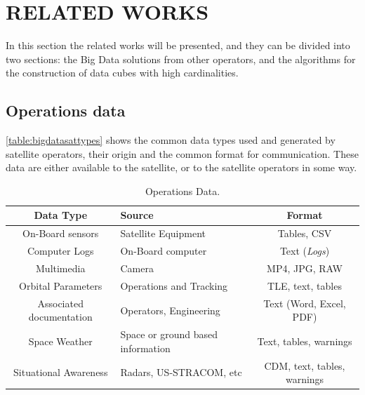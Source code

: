 
\chapter{RELATED WORKS}\label{ch:corr}

In this section the related works will be presented, and they can be divided into two sections: the Big Data solutions from other operators, and the algorithms for the construction of data cubes with high cardinalities.

\section{Operations data}\label{ch:corr:data}

\autoref{table:bigdatasattypes} shows the common data types used and generated by satellite operators, their origin and the common format for communication.
These data are either available to the satellite, or to the satellite operators in some way.

\begin{table}[!ht]
  \begin{center}
    \caption{Operations Data.}\label{table:bigdatasattypes}
    \begin{tabular}{|c|C{5cm}|c|}
      \hline
      \bfseries Data Type & \bfseries Source           & \bfseries Format      \\
      \hline
      On-Board sensors & Satellite Equipment & Tables, CSV           \\
      \hline
      Computer Logs & On-Board computer& Text (\textit{Logs})  \\
      \hline
      Multimedia                     & Camera                    & MP4, JPG, RAW          \\
      \hline
      Orbital Parameters & Operations and Tracking & TLE, text, tables    \\
      \hline
      Associated documentation & Operators, Engineering  & Text (Word, Excel, PDF)    \\
      \hline
      Space Weather & Space or ground based information & Text, tables, warnings \\
      \hline
      Situational Awareness & Radars, US-STRACOM, etc   & CDM, text, tables, warnings \\
      \hline
    \end{tabular}
  \end{center}
\end{table}

